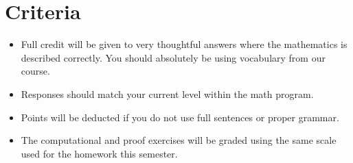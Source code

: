 \documentclass[12pt]{article}
\begin{document}
	\section*{Criteria}
		\begin{itemize}
			\item Full credit will be given to very thoughtful answers where the mathematics is described correctly. You should absolutely be using vocabulary from our course.
			\item Responses should match your current level within the math program.
			\item Points will be deducted if you do not use full sentences or proper grammar.
			\item The computational and proof exercises will be graded using the same scale used for the homework this semester.
		\end{itemize}
	\newpage
\end{document}
